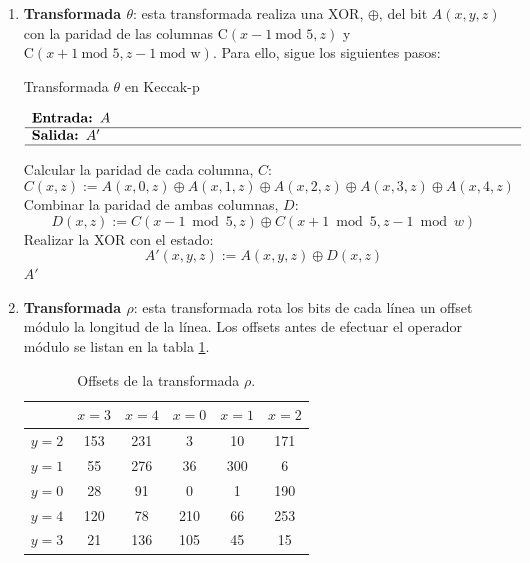 \begin{enumerate}
	\item \textbf{Transformada \(\theta\)}: esta transformada realiza una XOR, $\oplus$, del bit \(A(x,y,z)\) con la paridad de las columnas \(\text{C}(x-1 \ \text{mod } 5,z)\) y $\text{C}(x+1 \ \text{mod } 5,z-1 \ \text{mod w} )$. Para ello, sigue los siguientes pasos:
	
	\begin{algorithm}[H]
		\caption{Transformada \(\theta\) en Keccak-p}
		$\begin{array}{p{\textwidth}}
			\textbf{Entrada: }\(A\) \\ 
			\hline
			\textbf{Salida: }\(A'\) \\ 
			\hline
		\end{array}$
		\begin{algorithmic}[1]
			\State Calcular la paridad de cada columna, \(C\):
			\begin{equation}
				C(x,z):=A(x,0,z) \oplus A(x,1,z) \oplus A(x,2,z) \oplus A(x,3,z) \oplus A(x,4,z) 
			\end{equation}
			\State Combinar la paridad de ambas columnas, \(D\):
			\begin{equation}
				D(x,z):=C(x-1 \bmod 5,z) \oplus C(x+1 \bmod 5,z-1 \bmod w)
			\end{equation}
			\State Realizar la XOR con el estado:
			\begin{equation}
				A'(x,y,z):=A(x,y,z)\oplus D(x,z)
			\end{equation}
			\State \Return \(A'\)
		\end{algorithmic}
	\end{algorithm}
	\item \textbf{Transformada \(\rho\)}: esta transformada rota los bits de cada línea un offset módulo la longitud de la línea. Los offsets antes de efectuar el operador módulo se listan en la tabla \ref{tab:rhooffsets}.
	
	\begin{table}[H]
		\centering
		\begin{tabular}{|c|c|c|c|c|c|}
			\hline
			& $x = 3$ & $x = 4$ & $x = 0$ & $x = 1$ & $x = 2$ \\
			\hline
			$y = 2$ & 153 & 231 & 3 & 10 & 171 \\
			\hline
			$y = 1$ & 55 & 276 & 36 & 300 & 6 \\
			\hline
			$y = 0$ & 28 & 91 & 0 & 1 & 190 \\
			\hline
			$y = 4$ & 120 & 78 & 210 & 66 & 253 \\
			\hline
			$y = 3$ & 21 & 136 & 105 & 45 & 15 \\
			\hline
		\end{tabular}
		\caption{Offsets de la transformada $\rho$.}
		\label{tab:rhooffsets}
	\end{table}
	

\end{enumerate}
